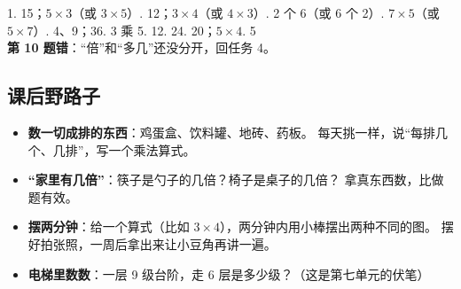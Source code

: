 \begin{ansbox}
1. 15；$5\times3$（或 $3\times5$）. 12；$3\times4$（或 $4\times3$）. 2 个 6（或 6 个 2）. $7\times5$（或 $5\times7$）. 4、9；36. 3 乘 5. 12. 24. 20；$5\times4$. 5 \\
\textbf{第 10 题错}：“倍”和“多几”还没分开，回任务 4。
\end{ansbox}

\subsection{课后野路子}

\begin{itemize}
  \item \textbf{数一切成排的东西}：鸡蛋盒、饮料罐、地砖、药板。
        每天挑一样，说“每排几个、几排”，写一个乘法算式。
  \item \textbf{“家里有几倍”}：筷子是勺子的几倍？椅子是桌子的几倍？
        拿真东西数，比做题有效。
  \item \textbf{摆两分钟}：给一个算式（比如 $3\times4$），两分钟内用小棒摆出两种不同的图。
        摆好拍张照，一周后拿出来让小豆角再讲一遍。
  \item \textbf{电梯里数数}：一层 9 级台阶，走 6 层是多少级？（这是第七单元的伏笔）
\end{itemize}
